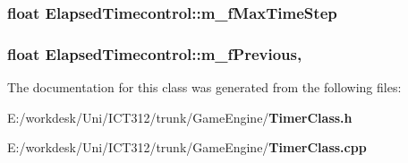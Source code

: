 \subsubsection[{m\+\_\+f\+Max\+Time\+Step}]{\setlength{\rightskip}{0pt plus 5cm}float Elapsed\+Timecontrol\+::m\+\_\+f\+Max\+Time\+Step\hspace{0.3cm}{\ttfamily [private]}}\label{class_elapsed_timecontrol_a9148ff335b4ed930cc815e8fcc5c387d}
\subsubsection[{m\+\_\+f\+Previous}]{\setlength{\rightskip}{0pt plus 5cm}float Elapsed\+Timecontrol\+::m\+\_\+f\+Previous\hspace{0.3cm}{\ttfamily [mutable]}, {\ttfamily [private]}}\label{class_elapsed_timecontrol_af65fb08776e737ccd3f8adcaccb1185a}


The documentation for this class was generated from the following files\+:\begin{DoxyCompactItemize}
\item 
E\+:/workdesk/\+Uni/\+I\+C\+T312/trunk/\+Game\+Engine/{\bf Timer\+Class.\+h}\item 
E\+:/workdesk/\+Uni/\+I\+C\+T312/trunk/\+Game\+Engine/{\bf Timer\+Class.\+cpp}\end{DoxyCompactItemize}
